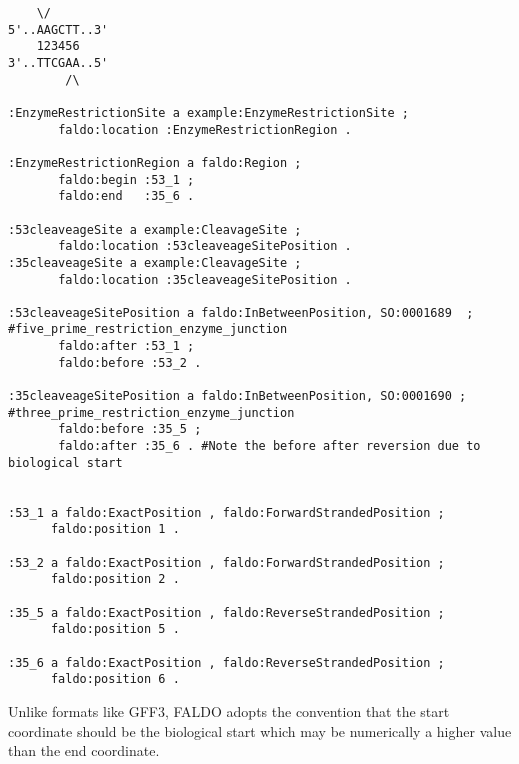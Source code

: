 \begin{verbatim}
    \/
5'..AAGCTT..3' 
    123456
3'..TTCGAA..5'
        /\
        
:EnzymeRestrictionSite a example:EnzymeRestrictionSite ;
       faldo:location :EnzymeRestrictionRegion .
       
:EnzymeRestrictionRegion a faldo:Region ;
       faldo:begin :53_1 ;
       faldo:end   :35_6 .
       
:53cleaveageSite a example:CleavageSite ;
       faldo:location :53cleaveageSitePosition .
:35cleaveageSite a example:CleavageSite ;
       faldo:location :35cleaveageSitePosition .
        
:53cleaveageSitePosition a faldo:InBetweenPosition, SO:0001689  ; #five_prime_restriction_enzyme_junction 
       faldo:after :53_1 ;        
       faldo:before :53_2 .
       
:35cleaveageSitePosition a faldo:InBetweenPosition, SO:0001690 ; #three_prime_restriction_enzyme_junction 
       faldo:before :35_5 ;
       faldo:after :35_6 . #Note the before after reversion due to biological start      

       
:53_1 a faldo:ExactPosition , faldo:ForwardStrandedPosition ;
      faldo:position 1 .

:53_2 a faldo:ExactPosition , faldo:ForwardStrandedPosition ;
      faldo:position 2 .

:35_5 a faldo:ExactPosition , faldo:ReverseStrandedPosition ;
      faldo:position 5 .

:35_6 a faldo:ExactPosition , faldo:ReverseStrandedPosition ;
      faldo:position 6 .
\end{verbatim}


Unlike formats like GFF3, FALDO adopts the convention that
the start coordinate should be the biological start which 
may be numerically a higher value than the end coordinate.

